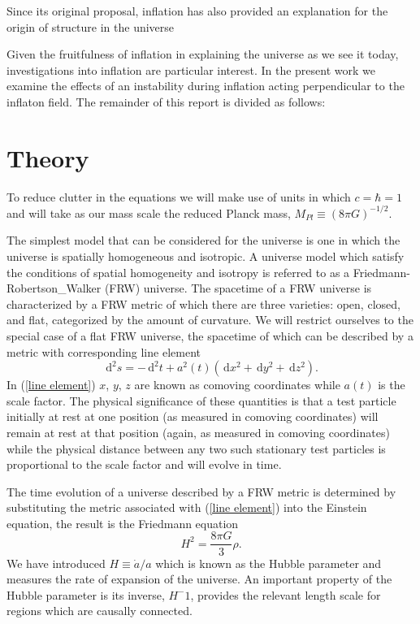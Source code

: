 \documentclass[letterpaper,11pt]{article}
\newcommand{\ud}{\,\mathrm{d}}
\begin{document}
Since its original proposal, inflation has also provided an explanation for the origin of structure in the universe %

Given the fruitfulness of inflation in explaining the universe as we see it today, investigations into inflation are particular interest. In the present work we examine the effects of an instability during inflation acting perpendicular to the inflaton field. The remainder of this report is divided as follows:

\section{Theory}
To reduce clutter in the equations we will make use of units in which $c=\hbar=1$ and will take as our mass scale the reduced Planck mass, $M_{Pl}\equiv (8\pi G)^{-1/2}$.

The simplest model that can be considered for the universe is one in which the universe is spatially homogeneous and isotropic. A universe model which satisfy the conditions of spatial homogeneity and isotropy is referred to as a Friedmann-Robertson_Walker (FRW) universe. The spacetime of a FRW universe is characterized by a FRW metric of which there are three varieties: open, closed, and flat, categorized by the amount of curvature. We will restrict ourselves to the special case of a flat FRW universe, the spacetime of which can be described by a metric with corresponding line element
\begin{equation}
\ud^2s=-\ud^2t+a^2(t)(\ud x^2+\ud y^2+\ud z^2). \label{line element}
\end{equation}
In (\ref{line element}) $x$, $y$, $z$ are known as comoving coordinates while $a(t)$ is the scale factor. The physical significance of these quantities is that a test particle initially at rest at one position (as measured in comoving coordinates) will remain at rest at that position (again, as measured in comoving coordinates) while the physical distance between any two such stationary test particles is proportional to the scale factor and will evolve in time.

The time evolution of a universe described by a FRW metric is determined by substituting the metric associated with (\ref{line element}) into the Einstein equation, the result is the Friedmann equation
\begin{equation}
H^2=\frac{8\pi G}{3}\rho. \label{fried eqn}
\end{equation}
We have introduced $H\equiv \dot{a}/a$ which is known as the Hubble parameter and measures the rate of expansion of the universe. An important property of the Hubble parameter is its inverse, $H^-1$, provides the relevant length scale for regions which are causally connected.%
\end{document}
